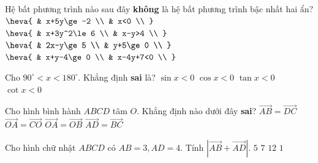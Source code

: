 \begin{ex}%
	
	Hệ bất phương trình nào sau đây \textbf{không} là hệ bất phương trình bậc nhất hai ẩn?
	\choice
	{ $\heva{ 
			& x+5y\ge -2 \\
			& x<0 \\
		}$}
	{\True $\heva{
			& x+3y^2\le 6 \\
			& x-y>4 \\
		}$}
	{ $\heva{
			& 2x-y\ge 5 \\
			& y+5\ge 0 \\
		}$}
	{ $\heva{
			& x+y-4\ge 0 \\
			& x-4y+7<0 \\
		}$}
\end{ex}


\begin{ex}%
	
	Cho ${90}^\circ <x<{180}^\circ $. Khẳng định \textbf{sai} là?
	\choice
	{\True $\sin{x}<0$}
	{ $\cos{x}<0$}
	{ $\tan{x}<0$}
	{ $\cot{x}<0$}
\end{ex}

\begin{ex}%
	
	Cho hình bình hành $ABCD$ tâm $O$. Khẳng định nào dưới đây \textbf{sai}?
	\choice
	{ $\overrightarrow{AB}=\overrightarrow{DC}$}
	{ $\overrightarrow{OA}=\overrightarrow{CO}$}
	{\True $\overrightarrow{OA}=\overrightarrow{OB}$}
	{ $\overrightarrow{AD}=\overrightarrow{BC}$}
\end{ex}
\begin{ex}%
	
	Cho hình chữ nhật $ABCD$ có $AB=3,AD=4$. Tính $\left| \overrightarrow{AB}+\overrightarrow{AD} \right|$.
	\choice
	{\True $5$}
	{ $7$}
	{ $12$}
	{ $1$}
\end{ex}

